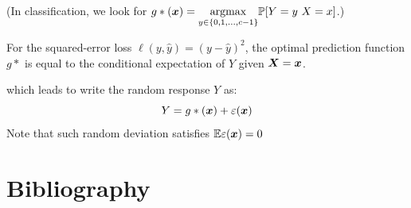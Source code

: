 \documentclass{beamer}
\begin{document}
\begin{frame}[allowframebreaks]
  (In classification, we look for $g* (\vx) = \underset{y\in\{0,1,\ldots,c-1\}}{\mathrm{argmax}}  \Prob[Y=y \ X=x]$.)

  \begin{theorem}
    For the squared-error loss $\ell (y,\hat{y})=(y-\hat{y})^2$, the optimal prediction function $g*$ is equal to the conditional expectation of $Y$ given $\bm{X}=\bm{x}$.
  \end{theorem}
  which leads to write the random response $Y$ as:
  \[Y=g*(\bm{x})+\varepsilon(\bm{x})\]
  Note that such random deviation satisfies $\mathbb{E} \varepsilon(\bm{x})=0$
\end{frame}


\section{Bibliography}


\end{document}

